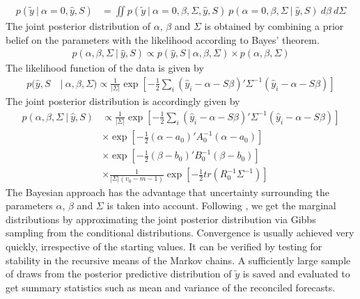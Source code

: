 \documentclass[a4paper,fleqn,11pt]{article}
\begin{document}
\begin{align*}
p(\tilde{y}\ |\ \alpha = 0,\hat{y}, S) &= \iint p(\tilde{y}\  |\  \alpha = 0,\beta,\Sigma,\hat{y},S)\ p(\alpha = 0,\beta,\Sigma\  |\  \hat{y},S)\ d\beta\ d\Sigma
\end{align*}
The joint posterior distribution of $\alpha$, $\beta$ and $\Sigma$ is obtained by combining a prior belief on the parameters with the likelihood according to Bayes' theorem.
\begin{align}
p(\alpha, \beta, \Sigma\ |\ \hat{y}, S) \propto p(\hat{y}, S\ |\ \alpha, \beta, \Sigma) \times p(\alpha, \beta, \Sigma)
\end{align}
The likelihood function of the data is given by
\begin{align*}
p(\hat{y},S\ &|\ \alpha,\beta,\Sigma) \propto \frac{1}{|\Sigma|} \exp\left[-\frac{1}{2} \sum_i  (\hat{y}_i - \alpha - S\beta)'\Sigma^{-1}(\hat{y}_i - \alpha - S\beta)\right]
\end{align*}
The joint posterior distribution is accordingly given by
\begin{align*}
p(\alpha,\beta,\Sigma\ |\ \hat{y},S) & \propto \frac{1}{|\Sigma|} \exp\left[-\frac{1}{2} \sum_i  (\hat{y}_i - \alpha - S\beta)'\Sigma^{-1}(\hat{y}_i - \alpha - S\beta)\right] \\
&\times \exp \left[-\frac{1}{2}(\alpha - a_0)'A_0^{-1}(\alpha - a_0)\right] \\
&\times \exp \left[-\frac{1}{2}(\beta - b_0)'B_0^{-1}(\beta - b_0)\right] \\
&\times \frac{1}{|\Sigma|(v_0 - m - 1)} \exp \left[-\frac{1}{2} tr(R_0^{-1}\Sigma^{-1}) \right]
\end{align*}
The Bayesian approach has the advantage that uncertainty surrounding the parameters $\alpha$, $\beta$ and $\Sigma$ is taken into account. Following \cite{Percy1992}, we get the marginal distributions by approximating the joint posterior distribution via Gibbs sampling from the conditional distributions.  Convergence is usually achieved very quickly, irrespective of the starting values. It can be verified by testing for stability in the recursive means of the Markov chains. A sufficiently large sample of draws from the posterior predictive distribution of $\tilde{y}$ is saved and evaluated to get summary statistics such as mean and variance of the reconciled forecasts.\\
\end{document}
